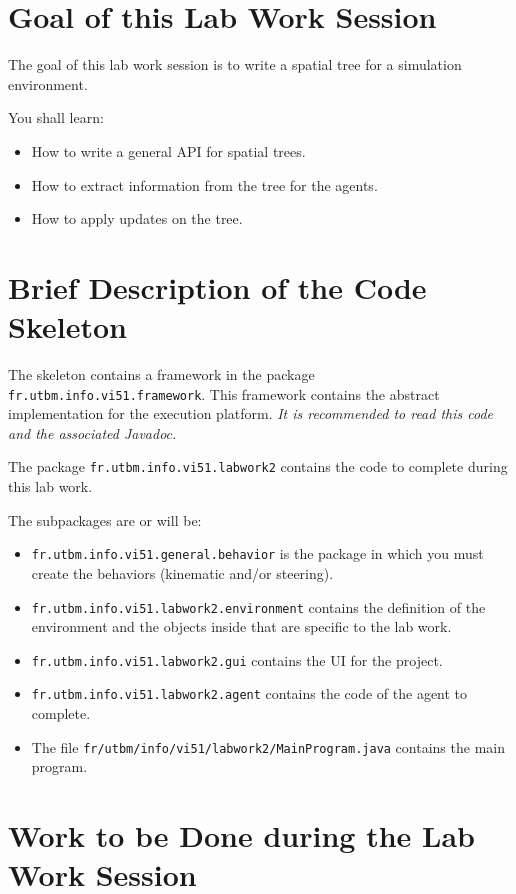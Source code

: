 \documentclass[article,english,nodocumentinfo]{multiagentfrreport}
\begin{document}
\section{Goal of this Lab Work Session}

The goal of this lab work session is to write a spatial tree for a simulation environment.

You shall learn: 
\begin{itemize}
\item How to write a general API for spatial trees.
\item How to extract information from the tree for the agents.
\item How to apply updates on the tree.
\end{itemize}



\section{Brief Description of the Code Skeleton}

The skeleton contains a framework in the package \texttt{fr.utbm.info.vi51.framework}.
This framework contains the abstract implementation for the execution platform.
\emph{It is recommended to read this code and the associated Javadoc.}

The package \texttt{fr.utbm.info.vi51.labwork2} contains the code to complete during this lab work.

The subpackages are or will be:
\begin{itemize}
\item \texttt{fr.utbm.info.vi51.general.behavior} is the package in which you must create the behaviors (kinematic and/or steering).
\item \texttt{fr.utbm.info.vi51.labwork2.environment} contains the definition of the environment and the objects inside that are specific to the lab work.
\item \texttt{fr.utbm.info.vi51.labwork2.gui} contains the UI for the project.
\item \texttt{fr.utbm.info.vi51.labwork2.agent} contains the code of the agent to complete.
\item The file \texttt{fr/utbm/info/vi51/labwork2/MainProgram.java} contains the main program.
\end{itemize}

\section{Work to be Done during the Lab Work Session}
\end{document}
